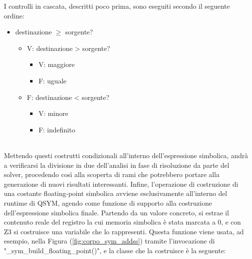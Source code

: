\documentclass[Lau, oneside]{sapthesis}%
\begin{document}
\newpage
I controlli in cascata, descritti poco prima, sono eseguiti secondo il seguente ordine:
\begin{itemize}
    \item destinazione $\geq$ sorgente?
    \begin{itemize}
        \item V: destinazione > sorgente?
        \begin{itemize}
            \item V: maggiore
            \item F: uguale
        \end{itemize}
        \item F: destinazione < sorgente?
        \begin{itemize}
            \item V: minore
            \item F: indefinito
        \end{itemize}
    \end{itemize}
\end{itemize}
\ \\
Mettendo questi costrutti condizionali all'interno dell'espressione simbolica, andrà a verificarsi la divisione in due dell'analisi in fase di risoluzione da parte del solver, procedendo così alla scoperta di rami che potrebbero portare alla generazione di nuovi risultati interessanti.
\newline \newline \newline
Infine, l'operazione di costruzione di una costante floating-point simbolica avviene esclusivamente all'interno del runtime di QSYM, agendo come funzione di supporto alla costruzione dell'espressione simbolica finale.
\newline
Partendo da un valore concreto, si estrae il contenuto reale del registro la cui memoria simbolica è stata marcata a 0, e con Z3 si costruisce una variabile che lo rappresenti.
\newline \newline
Questa funzione viene usata, ad esempio, nella Figura (\ref{fig:corpo_sym_addss}) tramite l'invocazione di "\_sym\_build\_floating\_point()", e la classe che la costruisce è la seguente:
\end{document}
